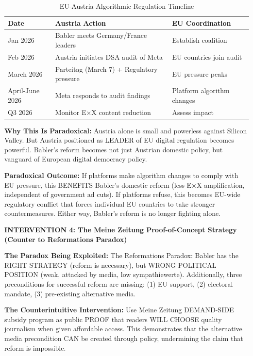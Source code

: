 \begin{enumerate}
  \begin{table}[h]
  \centering
  \caption{EU-Austria Algorithmic Regulation Timeline}
  \label{tab:dx-eu-coordination}
  \begin{tabular}{|l|l|l|}
  \hline
  \textbf{Date} & \textbf{Austria Action} & \textbf{EU Coordination} \\
  \hline
  Jan 2026 & Babler meets Germany/France leaders & Establish coalition \\
  Feb 2026 & Austria initiates DSA audit of Meta & EU countries join audit \\
  March 2026 & Parteitag (March 7) + Regulatory pressure & EU pressure peaks \\
  April-June 2026 & Meta responds to audit findings & Platform algorithm changes \\
  Q3 2026 & Monitor E×X content reduction & Assess impact \\
  \hline
  \end{tabular}
  \end{table}

\end{enumerate}

\textbf{Why This Is Paradoxical:} Austria alone is small and powerless against Silicon Valley. But Austria
positioned as LEADER of EU digital regulation becomes powerful. Babler's reform becomes not just Austrian
domestic policy, but vanguard of European digital democracy policy.

\textbf{Paradoxical Outcome:} If platforms make algorithm changes to comply with EU pressure, this
BENEFITS Babler's domestic reform (less E×X amplification, independent of government ad cuts).
If platforms refuse, this becomes EU-wide regulatory conflict that forces individual EU countries to take
stronger countermeasures. Either way, Babler's reform is no longer fighting alone.

\vspace{0.5cm}

\textbf{INTERVENTION 4: The Meine Zeitung Proof-of-Concept Strategy (Counter to Reformations Paradox)}

\textbf{The Paradox Being Exploited:} The Reformations Paradox: Babler has the RIGHT STRATEGY (reform is necessary),
but WRONG POLITICAL POSITION (weak, attacked by media, low sympathiewerte). Additionally, three preconditions for
successful reform are missing: (1) EU support, (2) electoral mandate, (3) pre-existing alternative media.

\textbf{The Counterintuitive Intervention:} Use Meine Zeitung DEMAND-SIDE subsidy program as public PROOF that
readers WILL CHOOSE quality journalism when given affordable access. This demonstrates that the alternative media
precondition CAN be created through policy, undermining the claim that reform is impossible.

